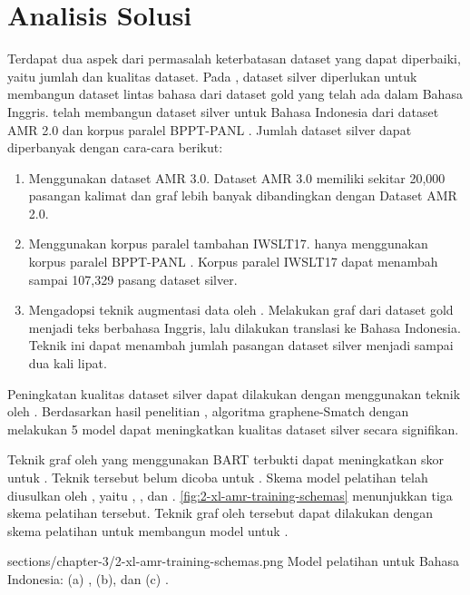 \section{Analisis Solusi}

Terdapat dua aspek dari permasalah keterbatasan dataset yang dapat diperbaiki, yaitu jumlah dan kualitas dataset.
Pada \amrparsing{}, dataset silver diperlukan untuk membangun dataset lintas bahasa dari dataset gold yang telah ada dalam Bahasa Inggris.
\textcite{putra2022} telah membangun dataset silver untuk Bahasa Indonesia dari dataset AMR 2.0 dan korpus paralel BPPT-PANL .
Jumlah dataset silver dapat diperbanyak dengan cara-cara berikut:
\begin{enumerate}
  \item Menggunakan dataset AMR 3.0.
  Dataset AMR 3.0 memiliki sekitar 20,000 pasangan kalimat dan graf \AMR{} lebih banyak dibandingkan dengan Dataset AMR 2.0.

  \item Menggunakan korpus paralel tambahan IWSLT17.
  \textcite{putra2022} hanya menggunakan korpus paralel BPPT-PANL .
  Korpus paralel IWSLT17  dapat menambah sampai 107,329 pasang dataset silver.

  \item Mengadopsi teknik augmentasi data oleh \textcite{lee2022}.
  Melakukan  graf \AMR{} dari dataset gold menjadi teks berbahasa Inggris, lalu dilakukan translasi ke Bahasa Indonesia.
  Teknik ini dapat menambah jumlah pasangan dataset silver menjadi sampai dua kali lipat.
\end{enumerate}

Peningkatan kualitas dataset silver dapat dilakukan dengan menggunakan teknik  oleh \textcite{lee2022}.
Berdasarkan hasil penelitian \textcite{lee2022}, algoritma graphene-Smatch  dengan melakukan  5 model  \AMR{}  dapat meningkatkan kualitas dataset silver secara signifikan.

Teknik \pretraining{} graf oleh \textcite{bai2022} yang menggunakan  \gls{BART} terbukti dapat meningkatkan skor \SMATCH{} untuk \amrparsing{}.
Teknik tersebut belum dicoba untuk \crosslingual{} \amrparsing{}.
Skema model pelatihan \crosslingual{} \amrparsing{} telah diusulkan oleh \textcite{blloshmi2020}, yaitu , , dan .
\cref{fig:2-xl-amr-training-schemas} menunjukkan tiga skema pelatihan tersebut.
Teknik \pretraining{} graf oleh \textcite{bai2022} tersebut dapat dilakukan dengan skema pelatihan \textcite{blloshmi2020} untuk membangun model \crosslingual{} untuk  \amrparsing{}.

  {sections/chapter-3/2-xl-amr-training-schemas.png}
  {Model pelatihan \crosslingual{} untuk Bahasa Indonesia: (a) , (b), dan (c)  .}
